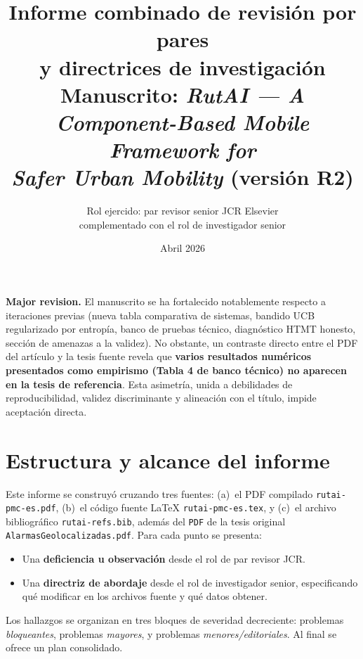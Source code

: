 \documentclass[11pt,a4paper]{article}
\title{Informe combinado de revisi\'on por pares \\
       y directrices de investigaci\'on \\[6pt]
       \large Manuscrito: \emph{RutAI --- A Component-Based Mobile Framework for\\ Safer Urban Mobility} (versi\'on R2)}
\author{Rol ejercido: par revisor senior JCR Elsevier \\ complementado con el rol de investigador senior}
\date{Abril 2026}
\begin{document}
\maketitle

\begin{verdicto}
\textbf{Major revision.} El manuscrito se ha fortalecido notablemente respecto a iteraciones previas (nueva tabla comparativa de sistemas, bandido UCB regularizado por entrop\'ia, banco de pruebas t\'ecnico, diagn\'ostico HTMT honesto, secci\'on de amenazas a la validez). No obstante, un contraste directo entre el PDF del art\'iculo y la tesis fuente revela que \textbf{varios resultados num\'ericos presentados como empirismo (Tabla 4 de banco t\'ecnico) no aparecen en la tesis de referencia}. Esta asimetr\'ia, unida a debilidades de reproducibilidad, validez discriminante y alineaci\'on con el t\'itulo, impide aceptaci\'on directa.
\end{verdicto}

\tableofcontents
\vspace{0.8em}

\section{Estructura y alcance del informe}

Este informe se construy\'o cruzando tres fuentes: (a)~el PDF compilado \texttt{rutai-pmc-es.pdf}, (b)~el c\'odigo fuente LaTeX \texttt{rutai-pmc-es.tex}, y (c)~el archivo bibliogr\'afico \texttt{rutai-refs.bib}, adem\'as del \texttt{PDF} de la tesis original \texttt{AlarmasGeolocalizadas.pdf}. Para cada punto se presenta:

\begin{itemize}
  \item Una \textbf{deficiencia u observaci\'on} desde el rol de par revisor JCR.
  \item Una \textbf{directriz de abordaje} desde el rol de investigador senior, especificando qu\'e modificar en los archivos fuente y qu\'e datos obtener.
\end{itemize}

Los hallazgos se organizan en tres bloques de severidad decreciente: problemas \emph{bloqueantes}, problemas \emph{mayores}, y problemas \emph{menores/editoriales}. Al final se ofrece un plan consolidado.

\end{document}
